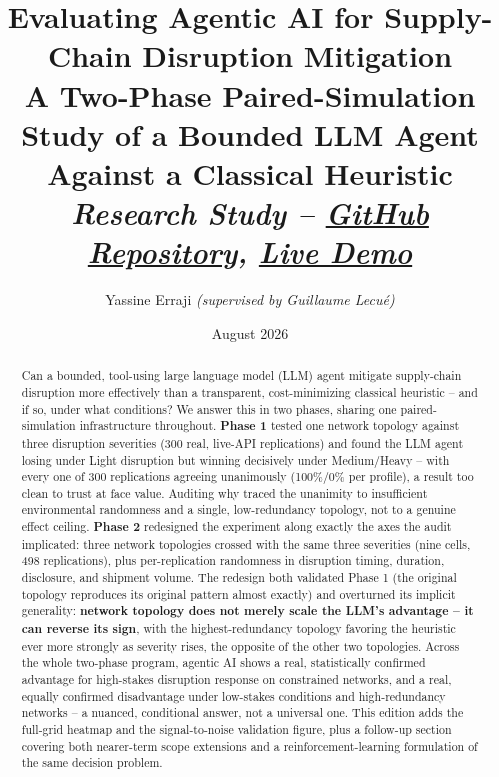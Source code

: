 \documentclass[10pt,twocolumn]{article}
\title{\vspace{-1.2em}\textbf{Evaluating Agentic AI for Supply-Chain Disruption Mitigation}\\
\large A Two-Phase Paired-Simulation Study of a Bounded LLM Agent Against a Classical Heuristic\\
\normalsize\itshape Research Study -- \href{https://github.com/yassineerraji/ResearchStudy}{GitHub Repository}, \href{https://research-study-three.vercel.app}{Live Demo}}
\author{\small Yassine Erraji \textit{(supervised by Guillaume Lecu\'e)}}
\date{\small August 2026}
\begin{document}
\maketitle
\vspace{-1.6em}

\begin{abstract}
\noindent Can a bounded, tool-using large language model (LLM) agent mitigate supply-chain disruption more effectively than a transparent, cost-minimizing classical heuristic -- and if so, under what conditions? We answer this in two phases, sharing one paired-simulation infrastructure throughout. \textbf{Phase 1} tested one network topology against three disruption severities (300 real, live-API replications) and found the LLM agent losing under Light disruption but winning decisively under Medium/Heavy -- with every one of 300 replications agreeing unanimously (100\%/0\% per profile), a result too clean to trust at face value. Auditing why traced the unanimity to insufficient environmental randomness and a single, low-redundancy topology, not to a genuine effect ceiling. \textbf{Phase 2} redesigned the experiment along exactly the axes the audit implicated: three network topologies crossed with the same three severities (nine cells, 498 replications), plus per-replication randomness in disruption timing, duration, disclosure, and shipment volume. The redesign both validated Phase 1 (the original topology reproduces its original pattern almost exactly) and overturned its implicit generality: \textbf{network topology does not merely scale the LLM's advantage -- it can reverse its sign}, with the highest-redundancy topology favoring the heuristic ever more strongly as severity rises, the opposite of the other two topologies. Across the whole two-phase program, agentic AI shows a real, statistically confirmed advantage for high-stakes disruption response on constrained networks, and a real, equally confirmed disadvantage under low-stakes conditions and high-redundancy networks -- a nuanced, conditional answer, not a universal one. This edition adds the full-grid heatmap and the signal-to-noise validation figure, plus a follow-up section covering both nearer-term scope extensions and a reinforcement-learning formulation of the same decision problem.
\end{abstract}
\end{document}
